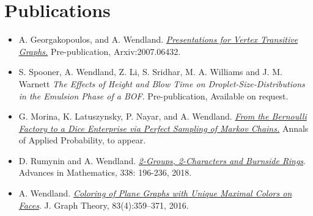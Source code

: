 \documentclass[a4paper,10pt]{article}
\begin{document}
\section{Publications}
\begin{itemize}
	\item
	A. Georgakopoulos, and A. Wendland. \href{https://arxiv.org/abs/2007.06432}{\emph{Presentations for Vertex Transitive Graphs.}} Pre-publication, Arxiv:2007.06432.
	\item 
	S. Spooner, A. Wendland, Z. Li, S. Sridhar, M. A. Williams and J. M. Warnett \emph{The Effects of Height and Blow Time on Droplet-Size-Distributions in the Emulsion Phase of a BOF}. Pre-publication, Available on request.
	\item 
	G. Morina, K. Latuszynsky, P. Nayar, and A. Wendland. \href{https://arxiv.org/abs/1912.09229}{\emph{From the Bernoulli Factory to a Dice Enterprise via Perfect Sampling of Markov Chains.}} Annals of Applied Probability, to appear.
	\item
	D. Rumynin and A. Wendland. \href{https://www.sciencedirect.com/science/article/pii/S0001870818303347}{\emph{2-Groups, 2-Characters and Burnside Rings}}. Advances in Mathematics, 338: 196-236, 2018.
	\item
	A. Wendland. \href{http://onlinelibrary.wiley.com/doi/10.1002/jgt.22002/abstract}{\emph{Coloring of Plane Graphs with Unique Maximal Colors on Faces}}. J. Graph Theory, 83(4):359–371, 2016.
\end{itemize}
\end{document}
